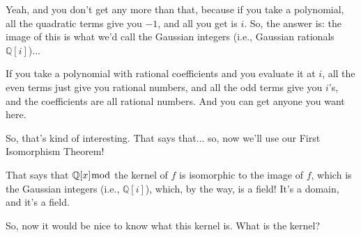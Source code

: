 \begin{speech}[01:23:04 - 01:24:02]
Yeah, and you don't get any more than that, because if you take a polynomial, all the quadratic terms give you $-1$, and all you get is $i$. So, the answer is: the image of this is what we'd call the Gaussian integers (i.e., Gaussian rationals $\mathbb{Q}[i]$)...  

If you take a polynomial with rational coefficients and you evaluate it at $i$, all the even terms just give you rational numbers, and all the odd terms give you $i$'s, and the coefficients are all rational numbers. And you can get anyone you want here. 

So, that's kind of interesting. That says that... so, now we'll use our First Isomorphism Theorem!  

That says that $\mathbb{Q}[x] \bmod$ the kernel of $f$ is isomorphic to the image of $f$, which is the Gaussian integers (i.e., $\mathbb{Q}[i]$), which, by the way, is a field!  It's a domain, and it's a field. 

So, now it would be nice to know what this kernel is. What is the kernel? 
\end{speech}

